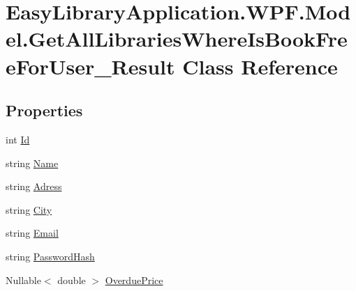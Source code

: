 \hypertarget{class_easy_library_application_1_1_w_p_f_1_1_model_1_1_get_all_libraries_where_is_book_free_for_user___result}{}\section{Easy\+Library\+Application.\+W\+P\+F.\+Model.\+Get\+All\+Libraries\+Where\+Is\+Book\+Free\+For\+User\+\_\+\+Result Class Reference}
\label{class_easy_library_application_1_1_w_p_f_1_1_model_1_1_get_all_libraries_where_is_book_free_for_user___result}
\subsection*{Properties}
\begin{DoxyCompactItemize}
\item 
int \mbox{\hyperlink{class_easy_library_application_1_1_w_p_f_1_1_model_1_1_get_all_libraries_where_is_book_free_for_user___result_ab1a77b626d54531245021f77f4c3a034}{Id}}
\item 
string \mbox{\hyperlink{class_easy_library_application_1_1_w_p_f_1_1_model_1_1_get_all_libraries_where_is_book_free_for_user___result_a91059752e77b0a53a47de3c8bdf296d8}{Name}}
\item 
string \mbox{\hyperlink{class_easy_library_application_1_1_w_p_f_1_1_model_1_1_get_all_libraries_where_is_book_free_for_user___result_a1ff76633e26305ebfc39fc358c06e331}{Adress}}
\item 
string \mbox{\hyperlink{class_easy_library_application_1_1_w_p_f_1_1_model_1_1_get_all_libraries_where_is_book_free_for_user___result_aaabbe4325820cc79ece7943b9492858d}{City}}
\item 
string \mbox{\hyperlink{class_easy_library_application_1_1_w_p_f_1_1_model_1_1_get_all_libraries_where_is_book_free_for_user___result_a2c126637cf63c8443038f158945df9c7}{Email}}
\item 
string \mbox{\hyperlink{class_easy_library_application_1_1_w_p_f_1_1_model_1_1_get_all_libraries_where_is_book_free_for_user___result_aedf639d92569aba293ae41557fe47bcf}{Password\+Hash}}
\item 
Nullable$<$ double $>$ \mbox{\hyperlink{class_easy_library_application_1_1_w_p_f_1_1_model_1_1_get_all_libraries_where_is_book_free_for_user___result_a532d90d045b8dca5881bbb07b2ca6ef3}{Overdue\+Price}}
\end{DoxyCompactItemize}


